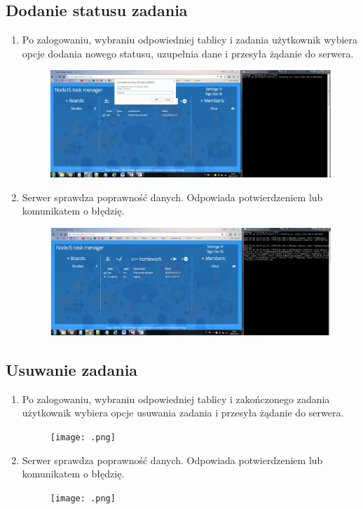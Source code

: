 \documentclass[12pt]{report}
\begin{document}
\begin{enumerate}
\begin{enumerate}
\begin{enumerate}
\subsection{Dodanie statusu zadania}
\begin{enumerate}
\item Po zalogowaniu, wybraniu odpowiedniej tablicy i zadania użytkownik wybiera opcje dodania nowego statusu, uzupełnia dane i przesyła żądanie do serwera.
\begin{figure}[!t]
\centering
\includegraphics{B1.png}
\end{figure}
\item Serwer sprawdza poprawność danych. Odpowiada potwierdzeniem lub komunikatem o błędzię.
\begin{figure}[!t]
\centering
\includegraphics{B2.png}
\end{figure}
\end{enumerate}

\subsection{Usuwanie zadania}
\begin{enumerate}
\item Po zalogowaniu, wybraniu odpowiedniej tablicy i zakończonego zadania użytkownik wybiera opcje usuwania zadania i przesyła żądanie do serwera.
\begin{figure}[!t]
\centering
\texttt{[image: .png]}
\end{figure}
\item Serwer sprawdza poprawność danych. Odpowiada potwierdzeniem lub komunikatem o błędzię.
\begin{figure}[!t]
\centering
\texttt{[image: .png]}
\end{figure}
\end{enumerate}


\end{enumerate}
\end{enumerate}
\end{enumerate}
\end{document}
